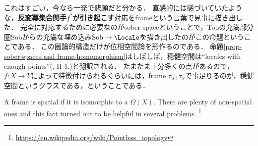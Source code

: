 \documentclass[uplatex,dvipdfmx]{jsreport}
\begin{document}
\begin{remark}\label{remark-locales}
    これはすごい，今なら一発で悲願だと分かる．
    直感的には感づいていたような，\textbf{反変冪集合関手$f^*$が引き起こす}対応をframeという言葉で見事に描き出した．
    完全に対応するために必要なのがsober spaceということで，Topの充満部分圏Sobからの充満な埋め込み$\mathrm{Sob}\to\Locale$を描き出したのがこの命題ということである．
    この圏論的構造だけが位相空間論を形作るのである．
    命題\ref{prop-sober-spaces-and-frame-homomorphism}はしばしば，穏健空間は“locales with enough points”(\cite{Johnstone2}, II 1.)と翻訳される．
    たまたま十分多くの点があるので，$f:X\to Y$によって特徴付けられるくらいには，frame $\tau_X,\tau_Y$で事足りるのが，穏健空間というクラスである，ということである．
\end{remark}

\begin{definition}[spacial]
    A frame is spatial if it is isomorphic to a $\Omega( X )$. There are plenty of non-spatial ones and this fact turned out to be helpful in several problems. \footnote{\url{https://en.wikipedia.org/wiki/Pointless_topology}}
\end{definition}
\end{document}
